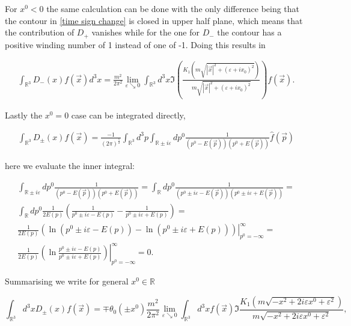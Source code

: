 \documentclass[a4paper,11pt]{article}
\begin{document}
For \(x^0<0\) the same calculation can be done with the only difference being that the contour in \eqref{time sign change} is closed in
upper half plane, which means that the contribution of \(D_+\) vanishes while for the one for \(D_-\) the contour has 
a positive winding number of 1 instead of one of -1. Doing this results in 

\begin{align}
\int_{\mathbb{R}^3} D_-(x)f(\vec{x})d^3x
  =\frac{ m^2}{2\pi^2} \lim_{\varepsilon \searrow 0} \int_{\mathbb{R}^3} d^3x \Im\left( \frac{K_1\left(m \sqrt{|\vec{x}|^2 + (\varepsilon + i x_0)^2}\right)}{m \sqrt{|\vec{x}|^2 + (\varepsilon + i x_0)^2}}
  \right) f(\vec{x}).
  \end{align}

Lastly the \(x^0=0\) case can be integrated directly,

\begin{align}
\int_{\mathbb{R}^3} D_{\pm}(x) f(\vec{x})
=\frac{-1}{(2\pi)^{\frac{5}{2}}} \int_{\mathbb{R}^3} d^3p \int_{\mathbb{R}\pm i \varepsilon}dp^0 \frac{1}{(p^0-E(\vec{p}))(p^0+E(\vec{p}))}\hat{f}(\vec{p})
\end{align}

here we evaluate the inner integral:

\begin{align}
\int_{\mathbb{R}\pm i \varepsilon}dp^0 \frac{1}{(p^0-E(\vec{p}))(p^0+E(\vec{p}))}=
\int_{\mathbb{R}}dp^0 \frac{1}{(p^0\pm i \varepsilon-E(\vec{p}))(p^0\pm i \varepsilon+E(\vec{p}))}=\\
\int_\mathbb{R} dp^0 \frac{1}{2 E(p)} \left( \frac{1}{p^0\pm i \varepsilon -E(p)} - \frac{1}{p^0 \pm i \varepsilon + E(p)}\right)=\\
\frac{1}{2E(p)} \left.\left( \ln (p^0\pm i\varepsilon -E(p)) - \ln (p^0 \pm i \varepsilon + E(p))\right)\right|_{p^0=-\infty}^\infty=\\
\frac{1}{2E(p)} \left.\left( \ln\frac{ p^0\pm i\varepsilon -E(p)}{p^0 \pm i \varepsilon + E(p)}\right)\right|_{p^0=-\infty}^\infty=0.
\end{align}


Summarising we write for general \(x^0\in \mathbb{R}\)

\begin{equation}\label{ImK1}
\int_{\mathbb{R}^3}d^3 x D_\pm (x) f(\vec{x}) = 
\mp \theta_0(\pm x^0) \frac{ m^2}{2\pi^2} \lim_{\varepsilon \searrow 0} \int_{\mathbb{R}^3}d^3 x f(\vec{x}) \Im 
\frac{K_1(m \sqrt{-x^2 +2 i \varepsilon x^0 + \varepsilon^2})}{m \sqrt{-x^2 +2 i \varepsilon x^0 + \varepsilon^2}},
\end{equation}
\end{document}

